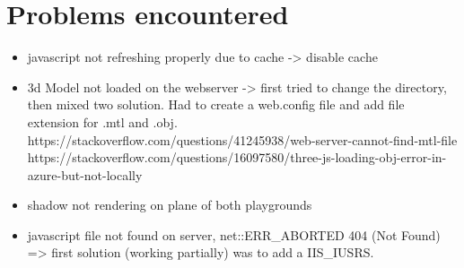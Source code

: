 \documentclass{scrartcl}
\begin{document}
\listoffigures

\listoftables

\section{Problems encountered}
\begin{itemize}
  \item javascript not refreshing properly due to cache -> disable cache
  \item 3d Model not loaded on the webserver -> first tried to change the directory, then mixed two solution. 
        Had to create a web.config file and add file extension for .mtl and .obj.
        https://stackoverflow.com/questions/41245938/web-server-cannot-find-mtl-file
        https://stackoverflow.com/questions/16097580/three-js-loading-obj-error-in-azure-but-not-locally
  \item shadow not rendering on plane of both playgrounds
  \item javascript file not found on server, net::ERR_ABORTED 404 (Not Found) => first solution (working partially) was to add a IIS_IUSRS.
\end{itemize}

\printbibliography[heading=bibintoc]
\end{document}
